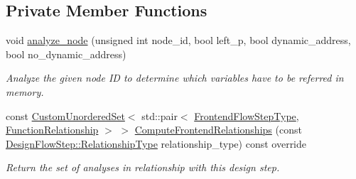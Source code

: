 \subsection*{Private Member Functions}
\begin{DoxyCompactItemize}
\item 
void \hyperlink{classdetermine__memory__accesses_a28b2c63625b32f4cb63221e0d8a51b96}{analyze\+\_\+node} (unsigned int node\+\_\+id, bool left\+\_\+p, bool dynamic\+\_\+address, bool no\+\_\+dynamic\+\_\+address)
\begin{DoxyCompactList}\small\item\em Analyze the given node ID to determine which variables have to be referred in memory. \end{DoxyCompactList}\item 
const \hyperlink{classCustomUnorderedSet}{Custom\+Unordered\+Set}$<$ std\+::pair$<$ \hyperlink{frontend__flow__step_8hpp_afeb3716c693d2b2e4ed3e6d04c3b63bb}{Frontend\+Flow\+Step\+Type}, \hyperlink{classFrontendFlowStep_af7cf30f2023e5b99e637dc2058289ab0}{Function\+Relationship} $>$ $>$ \hyperlink{classdetermine__memory__accesses_a00428eb833cbc6a1c65a23a184677851}{Compute\+Frontend\+Relationships} (const \hyperlink{classDesignFlowStep_a723a3baf19ff2ceb77bc13e099d0b1b7}{Design\+Flow\+Step\+::\+Relationship\+Type} relationship\+\_\+type) const override
\begin{DoxyCompactList}\small\item\em Return the set of analyses in relationship with this design step. \end{DoxyCompactList}\end{DoxyCompactItemize}
